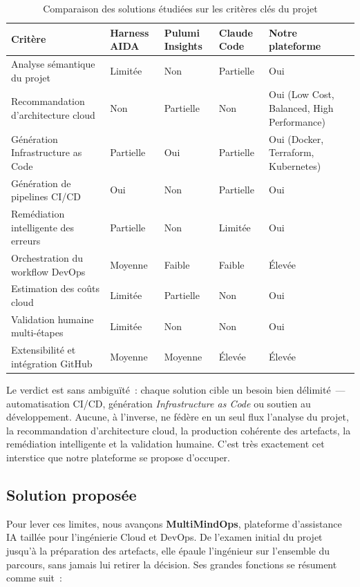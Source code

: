 \begin{table}[H]
    \centering
    \footnotesize
    \begin{tabularx}{\textwidth}{|>{\raggedright\arraybackslash}p{3.2cm}|>{\raggedright\arraybackslash}X|>{\raggedright\arraybackslash}X|>{\raggedright\arraybackslash}X|>{\raggedright\arraybackslash}X|}
        \hline
        \rowcolor{tableRow1}
        \textbf{Critère} & \textbf{Harness AIDA} & \textbf{Pulumi Insights} & \textbf{Claude Code} & \textbf{Notre plateforme} \\
        \hline
        Analyse sémantique du projet & Limitée & Non & Partielle & Oui \\
        \hline
        Recommandation d'architecture cloud & Non & Partielle & Non & Oui (Low Cost, Balanced, High Performance) \\
        \hline
        Génération Infrastructure as Code & Partielle & Oui & Partielle & Oui (Docker, Terraform, Kubernetes) \\
        \hline
        Génération de pipelines CI/CD & Oui & Non & Partielle & Oui \\
        \hline
        Remédiation intelligente des erreurs & Partielle & Non & Limitée & Oui \\
        \hline
        Orchestration du workflow DevOps & Moyenne & Faible & Faible & Élevée \\
        \hline
        Estimation des coûts cloud & Limitée & Partielle & Non & Oui \\
        \hline
        Validation humaine multi-étapes & Limitée & Non & Non & Oui \\
        \hline
        Extensibilité et intégration GitHub & Moyenne & Moyenne & Élevée & Élevée \\
        \hline
    \end{tabularx}
    \caption{Comparaison des solutions étudiées sur les critères clés du projet}
    \label{tab:comparaison-solutions}
\end{table}

Le verdict est sans ambiguïté~: chaque solution cible un besoin bien délimité~--- automatisation
CI/CD, génération \textit{Infrastructure as Code} ou soutien au développement. Aucune, à
l'inverse, ne fédère en un seul flux l'analyse du projet, la recommandation d'architecture
cloud, la production cohérente des artefacts, la remédiation intelligente et la validation
humaine. C'est très exactement cet interstice que notre plateforme se propose d'occuper.

\subsection{Solution proposée}
Pour lever ces limites, nous avançons \textbf{MultiMindOps}, plateforme d'assistance IA
taillée pour l'ingénierie Cloud et DevOps. De l'examen initial du projet jusqu'à la
préparation des artefacts, elle épaule l'ingénieur sur l'ensemble du parcours, sans jamais
lui retirer la décision. Ses grandes fonctions se résument comme suit~:

